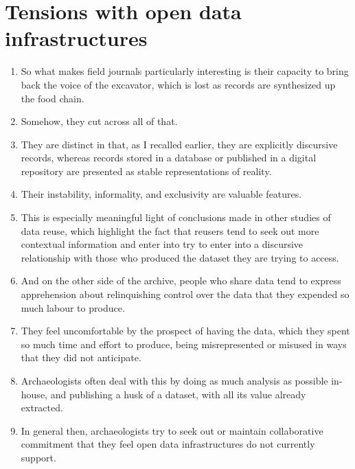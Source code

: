 \documentclass[12pt]{article}
\begin{document}
\section{Tensions with open data infrastructures}
\begin{enumerate}
  \item So what makes field journals particularly interesting is their capacity to bring back the voice of the excavator, which is lost as records are synthesized up the food chain.
  \item Somehow, they cut across all of that.
  \item They are distinct in that, as I recalled earlier, they are explicitly discursive records, whereas records stored in a database or published in a digital repository are presented as stable representations of reality.
  \item Their instability, informality, and exclusivity are valuable features.
  \item This is especially meaningful light of conclusions made in other studies of data reuse, which highlight the fact that reusers tend to seek out more contextual information and enter into try to enter into a discursive relationship with those who produced the dataset they are trying to access.
  \item And on the other side of the archive, people who share data tend to express apprehension about relinquishing control over the data that they expended so much labour to produce.
  \item They feel uncomfortable by the prospect of having the data, which they spent so much time and effort to produce, being misrepresented or misused in ways that they did not anticipate.
  \item Archaeologists often deal with this by doing as much analysis as possible in-house, and publishing a husk of a dataset, with all its value already extracted.
  \item In general then, archaeologists try to seek out or maintain collaborative commitment that they feel open data infrastructures do not currently support.
\end{enumerate}
\end{document}
